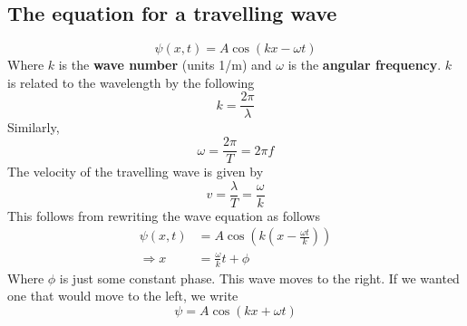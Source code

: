 \documentclass{report}
\numberwithin{equation}{section}
\begin{document}
\subsection{The equation for a travelling wave}
\begin{equation}
	\psi(x,t) = A\cos(kx-\omega t)
\end{equation}
Where $k$ is the \textbf{wave number} (units 1/m) and $\omega$ is the \textbf{angular frequency}. $k$ is related to the wavelength by the following
\begin{equation}
	k = \frac{2\pi}{\lambda}
\end{equation}
Similarly,
\begin{equation}
	\omega = \frac{2\pi}{T} = 2\pi f
\end{equation}
The velocity of the travelling wave is given by
\begin{equation}
	v = \frac{\lambda}{T} = \frac{\omega}{k}
\end{equation}
This follows from rewriting the wave equation as follows
\begin{align*}
	\psi(x,t) &= A\cos\!\left(k\left(x-\frac{\omega t}{k}\right)\right)\\
	\Rightarrow x &= \frac{\omega}{k}t + \phi
\end{align*}
Where $\phi$ is just some constant phase. This wave moves to the right. If we wanted one that would move to the left, we write
\begin{equation}
	\psi = A\cos(kx + \omega t)
\end{equation}
\end{document}
